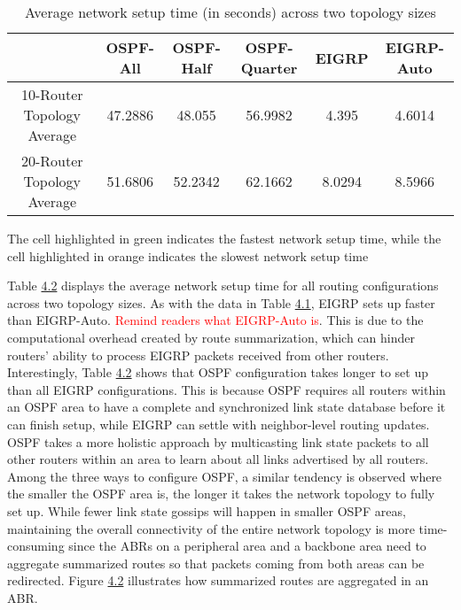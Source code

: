 \documentclass{uiucthesis2021}
\begin{document}
\label{t42}
\begin{table}[!h]
\begin{center}
\begin{tabular}{|c||c|c|c|c|c|} 
 \hline
  & OSPF-All & OSPF-Half & OSPF-Quarter & EIGRP & EIGRP-Auto \\
 \hline\hline
10-Router Topology Average & 47.2886 & 48.055 & \cellcolor{orange!25}56.9982 & \cellcolor{green!25}4.395 & 4.6014 \\
\hline
20-Router Topology Average & 51.6806 & 52.2342 & \cellcolor{orange!25}62.1662 & \cellcolor{green!25}8.0294 & 8.5966 \\
\hline
\end{tabular}
\caption{Average network setup time (in seconds) across two topology sizes}
The cell highlighted in green indicates the fastest network setup time, while the cell highlighted in orange
indicates the slowest network setup time
\end{center}
\end{table}

\noindent Table \hyperref[t42]{4.2} displays the average network setup time for all routing configurations across two topology sizes. As with the data in Table \hyperref[t41]{4.1}, EIGRP sets up faster than EIGRP-Auto. \textcolor{red}{Remind readers what EIGRP-Auto is}. This is due to the computational overhead created by route summarization, which can hinder routers' ability to process EIGRP packets received from other routers. \\

\noindent Interestingly, Table \hyperref[t42]{4.2} shows that OSPF configuration takes longer to set up than all EIGRP configurations. This is because OSPF requires all routers within an OSPF area to have a complete and synchronized link state database before it can finish setup, while EIGRP can settle with neighbor-level routing updates. OSPF takes a more holistic approach by multicasting link state packets to all other routers within an area to learn about all links advertised by all routers. Among the three ways to configure OSPF, a similar tendency is observed where the smaller the OSPF area is, the longer it takes the network topology to fully set up. While fewer link state gossips will happen in smaller OSPF areas, maintaining the overall connectivity of the entire network topology is more time-consuming since the ABRs on a peripheral area and a backbone area need to aggregate summarized routes so that packets coming from both areas can be redirected. Figure \hyperref[f42]{4.2} illustrates how summarized routes are aggregated in an ABR.\\
\end{document}
